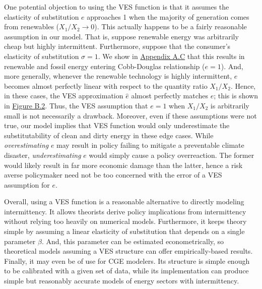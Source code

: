 \documentclass[11pt,a4paper]{extarticle}
\begin{document}
One potential objection to using the VES function is that it assumes the elasticity of substitution $e$ approaches 1 when the majority of generation comes from renewables ($X_1/X_2 \to 0$). This actually happens to be a fairly reasonable assumption in our model. That is, suppose renewable energy was arbitrarily cheap but highly intermittent. Furthermore, suppose that the consumer's elasticity of substitution $\sigma = 1$. We show in \hyperref[sec:asympeos]{Appendix A.C} that this results in renewable  and fossil energy entering Cobb-Douglas relationship ($e = 1$). And, more generally, whenever the renewable technology is highly intermittent, $e$ becomes almost perfectly linear with respect to the quantity ratio $X_1/X_2$. Hence, in these cases, the VES approximation $\hat{e}$ almost perfectly matches $e$; this is shown in \hyperref[fig:ves_int]{Figure B.2}. Thus, the VES assumption that $e = 1$ when $X_1/X_2$ is arbitrarily small is not necessarily a drawback. Moreover, even if these assumptions were not true, our model implies that VES function would only underestimate the substitutability of clean and dirty energy in these edge cases. While \textit{overestimating} $e$ may result in policy failing to mitigate a preventable climate disaster, \textit{underestimating} $e$ would simply cause a policy overreaction. The former would likely  result in far more economic damage than the latter, hence a risk averse policymaker need not be too concerned with the error of a VES assumption for $e$.   


Overall, using a VES function is a reasonable alternative to directly modeling intermittency. It allows theorists derive policy implications from intermittency without relying too heavily on numerical models. Furthermore, it keeps theory simple by assuming a linear elasticity of substitution that depends on a single parameter $\beta$. And, this parameter can be estimated econometrically, so theoretical models assuming a VES structure can offer empirically-based results. Finally, it may even be of use for CGE modelers. Its structure is simple enough to be calibrated with a given set of data, while its implementation can produce simple but reasonably accurate models of energy sectors with intermittency. 
\end{document}
